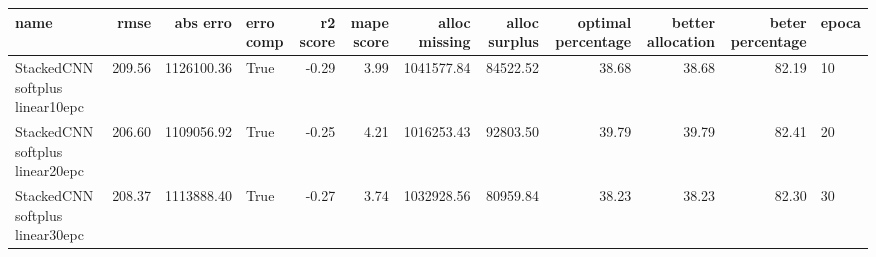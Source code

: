 \begin{tabular}{lrrlrrrrrrrl}
\toprule
name & rmse & abs erro & erro comp & r2 score & mape score & alloc missing & alloc surplus & optimal percentage & better allocation & beter percentage & epoca \\
\midrule
StackedCNN softplus linear10epc & 209.56 & 1126100.36 & True & -0.29 & 3.99 & 1041577.84 & 84522.52 & 38.68 & 38.68 & 82.19 & 10 \\
StackedCNN softplus linear20epc & 206.60 & 1109056.92 & True & -0.25 & 4.21 & 1016253.43 & 92803.50 & 39.79 & 39.79 & 82.41 & 20 \\
StackedCNN softplus linear30epc & 208.37 & 1113888.40 & True & -0.27 & 3.74 & 1032928.56 & 80959.84 & 38.23 & 38.23 & 82.30 & 30 \\
\bottomrule
\end{tabular}
